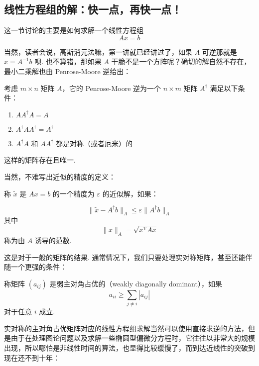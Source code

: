 \subsection{线性方程组的解：快一点，再快一点！}

这一节讨论的主要是如何求解一个线性方程组
\[
Ax = b
\]

当然，读者会说，高斯消元法嘛，第一讲就已经讲过了，如果 $A$ 可逆那就是 $x = A^{-1}b$ 呗. 也不算错，那如果 $A$ 干脆不是一个方阵呢？确切的解自然不存在，最小二乘解也由 Penrose-Moore 逆给出：

\begin{definition}
    考虑 $m \times n$ 矩阵 $A$，它的 Penrose-Moore 逆为一个 $n \times m$ 矩阵 $A^\dagger$ 满足以下条件：

    \begin{enumerate}
        \item $A A^\dagger A = A$
        \item $A^\dagger A A^\dagger = A^\dagger$
        \item $A^\dagger A$ 和 $AA^\dagger$ 都是对称（或者厄米）的
    \end{enumerate}

    这样的矩阵存在且唯一.
\end{definition}

当然，不难写出近似的精度的定义：

\begin{definition}
    称 $\tilde x$ 是 $Ax = b$ 的一个精度为 $\varepsilon$ 的近似解，如果：

    \[
    \lVert \tilde x - A^\dagger b \rVert_A \leqslant \varepsilon \lVert A^\dagger b \rVert_A
    \]
    其中
    \[
    \lVert x \rVert_A = \sqrt{x^\mathrm{T}Ax}
    \]
    称为由 $A$ 诱导的范数.
\end{definition}

这是对于一般的矩阵的结果. 通常情况下，我们只要处理实对称矩阵，甚至还能伴随一个更强的条件：

\begin{definition}
    称矩阵 $(a_{ij})$ 是弱主对角占优的（weakly diagonally dominant），如果
    \[
    a_{ii} \geqslant \sum_{j \neq i} |a_{ij}|
    \]
    对于任意 $i$ 成立.
\end{definition}

实对称的主对角占优矩阵对应的线性方程组求解当然可以使用直接求逆的方法，但是由于在处理图论问题以及求解一些椭圆型偏微分方程时，它往往以非常大的规模出现，所以哪怕是非线性时间的算法，也显得比较缓慢了，而到达近线性的突破到现在还不到十年：

